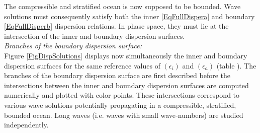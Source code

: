 \documentclass[a4paper,11pt]{article}
\begin{document}
The compressible and stratified ocean is now supposed to be bounded. Wave solutions must consequently satisfy both the inner \ref{EqFullDispera} and boundary \ref{EqFullDisperb} dispersion relations. In phase space, they must lie at the intersection of the inner and boundary dispersion surfaces.\\

\textit{Branches of the boundary dispersion surface:}\\
Figure \ref{FigDispSolutions} displays now simultaneously the inner and boundary dispersion surfaces for the same reference values of  $(\epsilon_i)$ and $(\epsilon_a)$ (table ). The branches of the boundary dispersion surface are first described before the intersections between the inner and boundary dispersion surfaces are computed numerically and plotted with color points. These intersections correspond to various wave solutions potentially propagating in a compressible, stratified, bounded ocean. Long waves (i.e. waves with small wave-numbers) are studied independently.
\end{document}
